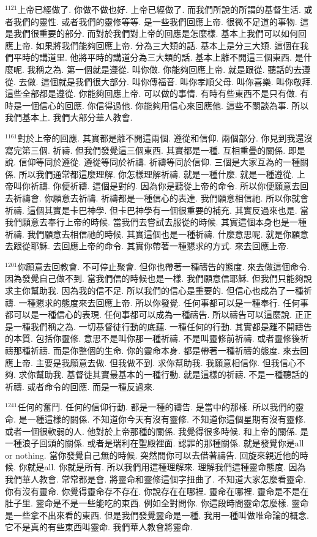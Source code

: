\documentclass{book}
\begin{document}
$^{1121}$上帝已經做了.
你做不做也好.
上帝已經做了.
而我們所說的所謂的基督生活.
或者我們的靈性.
或者我們的靈修等等.
是一些我們回應上帝.
很微不足道的事物.
這是我們很重要的部分.
而對於我們對上帝的回應是怎麼樣.
基本上我們可以如何回應上帝.
如果將我們能夠回應上帝.
分為三大類的話.
基本上是分三大類.
這個在我們平時的講道里.
他將平時的講道分為三大類的話.
基本上離不開這三個東西.
是什麼呢.
我稱之為.
第一個就是遵從.
叫你做.
你能夠回應上帝.
就是跟從.
聽話的去遵從.
去做.
這個就是我們很大部分.
叫你傳福音.
叫你孝順父母.
叫你喜樂.
叫你敬拜.
這些全部都是遵從.
你能夠回應上帝.
可以做的事情.
有時有些東西不是只有做.
有時是一個信心的回應.
你信得過他.
你能夠用信心來回應他.
這些不關談為事.
所以我們基本上.
我們大部分華人教會.

$^{1161}$對於上帝的回應.
其實都是離不開這兩個.
遵從和信仰.
兩個部分.
你見到我還沒寫完第三個.
祈禱.
但我們發覺這三個東西.
其實都是一種.
互相重疊的關係.
即是說.
信仰等同於遵從.
遵從等同於祈禱.
祈禱等同於信仰.
三個是大家互為的一種關係.
所以我們通常都這麼理解.
你怎樣理解祈禱.
就是一種什麼.
就是一種遵從.
上帝叫你祈禱.
你便祈禱.
這個是對的.
因為你是聽從上帝的命令.
所以你便願意去回去祈禱會.
你願意去祈禱.
祈禱都是一種信心的表達.
我們願意相信祂.
所以你就會祈禱.
這個其實是卡巴神學.
但卡巴神學有一個很重要的補充.
其實反過來也是.
當我們願意去奉行上帝的時候.
當我們去嘗試去服從的時候.
其實這個本身也是一種祈禱.
我們願意去相信祂的時候.
其實這個也是一種祈禱.
什麼意思呢.
就是你願意去跟從耶穌.
去回應上帝的命令.
其實你帶著一種懇求的方式.
來去回應上帝.

$^{1201}$你願意去回教會.
不可停止聚會.
但你也帶著一種禱告的態度.
來去做這個命令.
因為發覺自己做不到.
當我們信的時候也是一樣.
我們願意信耶穌.
但我們只能夠說求主你幫助我.
因為我的信不足.
所以我們的信心是重要的.
但信心也成為了一種祈禱.
一種懇求的態度來去回應上帝.
所以你發覺.
任何事都可以是一種奉行.
任何事都可以是一種信心的表現.
任何事都可以成為一種禱告.
所以禱告可以這麼說.
正正是一種我們稱之為.
一切基督徒行動的底蘊.
一種任何的行動.
其實都是離不開禱告的本質.
包括你靈修.
意思不是叫你那一種祈禱.
不是叫靈修前祈禱.
或者靈修後祈禱那種祈禱.
而是你整個的生命.
你的靈命本身.
都是帶著一種祈禱的態度.
來去回應上帝.
主要是我願意去做.
但我做不到.
求你幫助我.
我願意相信你.
但我信心不夠.
求你幫助我.
基督徒其實最基本的一種行動.
就是這樣的祈禱.
不是一種聽話的祈禱.
或者命令的回應.
而是一種反過來.

$^{1241}$任何的奮鬥.
任何的信仰行動.
都是一種的禱告.
是當中的那樣.
所以我們的靈命.
是一種這樣的關係.
不知道你今天有沒有靈修.
不知道你這個星期有沒有靈修.
或者一個很軟弱的人.
他對於上帝那種的關係.
我覺得很多時候.
和上帝的關係.
是一種浪子回頭的關係.
或者是瑞利在聖殿裡面.
認罪的那種關係.
就是發覺你是all or nothing.
當你發覺自己無的時候.
突然間你可以去借著禱告.
回旋來親近他的時候.
你就是all.
你就是所有.
所以我們用這種理解來.
理解我們這種靈命態度.
因為我們華人教會.
常常都是會.
將靈命和靈修這個字扭曲了.
不知道大家怎麼看靈命.
你有沒有靈命.
你覺得靈命存不存在.
你說存在在哪裡.
靈命在哪裡.
靈命是不是在肚子里.
靈命是不是一些能吃的東西.
例如全對問你.
你這段時間靈命怎麼樣.
靈命是一些拿不出來看的東西.
但是我們發覺靈命是一種.
我用一種叫做唯命論的概念.
它不是真的有些東西叫靈命.
我們華人教會將靈命.
\end{document}
